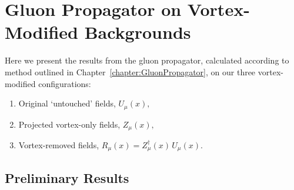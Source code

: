 
\chapter{Gluon Propagator on Vortex-Modified Backgrounds}
\ifpdf
    \graphicspath{{Chapter6/Figs/Raster/}{Chapter6/Figs/PDF/}{Chapter6/Figs/}}
\else
    \graphicspath{{Chapter6/Figs/Vector/}{Chapter6/Figs/}}
\fi
Here we present the results from the gluon propagator, calculated according to method outlined in Chapter~\ref{chapter:GluonPropagator}, on our three vortex-modified configurations:
\begin{enumerate}
\item Original `untouched' fields, $U_{\mu}(x),$

\item Projected vortex-only fields, $Z_{\mu}(x),$

\item Vortex-removed fields, $R_\mu(x) = Z^{\dagger}_{\mu}(x)\,U_{\mu}(x).$
\end{enumerate} 
\section{Preliminary Results}

